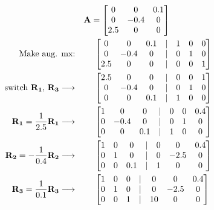 \documentclass{article}
\begin{document}
\begin{align}
    \label{eq:1}
    && \textbf{A} &= \begin{bmatrix}
    0&0&0.1\\
    0&-0.4&0\\
    2.5&0&0
    \end{bmatrix}
    \\
    \label{eq:2}
    \text{Make aug. mx:} && &\text{  } \begin{bmatrix}
    0 & 0 & 0.1 &|& 1 & 0 & 0\\
    0 & -0.4 & 0 &|& 0 & 1 & 0\\
    2.5 & 0 & 0 &|& 0 & 0 & 1
    \end{bmatrix}
    \\
    \label{eq:3}
    \text{switch \textbf{R\textsubscript{1}}, \textbf{R\textsubscript{3}}} \longrightarrow && &\text{ } \begin{bmatrix}
    2.5 & 0 & 0 &|& 0 & 0 & 1\\
    0 & -0.4 & 0 &|& 0 & 1 & 0\\
    0 & 0 & 0.1 &|& 1 & 0 & 0
    \end{bmatrix}
    \\
    \label{eq:4}
    \textbf{R\textsubscript{1}} = \frac{1}{2.5}\textbf{R\textsubscript{1}} \longrightarrow && &\text{ } \begin{bmatrix}
    1 & 0 & 0 &|& 0 & 0 & 0.4\\
    0 & -0.4 & 0 &|& 0 & 1 & 0\\
    0 & 0 & 0.1 &|& 1 & 0 & 0
    \end{bmatrix}
    \\
    \label{eq:5}
    \textbf{R\textsubscript{2}} = -\frac{1}{0.4}\textbf{R\textsubscript{2}} \longrightarrow && &\text{ } \begin{bmatrix}
    1 & 0 & 0 &|& 0 & 0 & 0.4\\
    0 & 1 & 0 &|& 0 & -2.5 & 0\\
    0 & 0 & 0.1 &|& 1 & 0 & 0
    \end{bmatrix}
    \\
    \label{eq:6}
    \textbf{R\textsubscript{3}} = \frac{1}{0.1}\textbf{R\textsubscript{3}} \longrightarrow && &\text{ } \begin{bmatrix}
    1 & 0 & 0 &|& 0 & 0 & 0.4\\
    0 & 1 & 0 &|& 0 & -2.5 & 0\\
    0 & 0 & 1 &|& 10 & 0 & 0
    \end{bmatrix}
    \\
    \label{eq:7}

\end{align}
\end{document}
